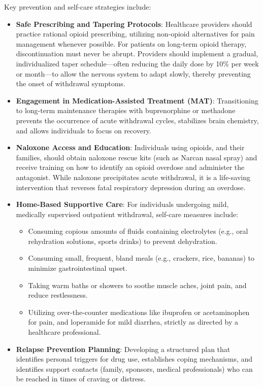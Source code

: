 Key prevention and self-care strategies include:
\begin{itemize}
    \item \textbf{Safe Prescribing and Tapering Protocols}: Healthcare providers should practice rational opioid prescribing, utilizing non-opioid alternatives for pain management whenever possible. For patients on long-term opioid therapy, discontinuation must never be abrupt. Providers should implement a gradual, individualized taper schedule—often reducing the daily dose by 10\% per week or month—to allow the nervous system to adapt slowly, thereby preventing the onset of withdrawal symptoms.
    \item \textbf{Engagement in Medication-Assisted Treatment (MAT)}: Transitioning to long-term maintenance therapies with buprenorphine or methadone prevents the occurrence of acute withdrawal cycles, stabilizes brain chemistry, and allows individuals to focus on recovery.
    \item \textbf{Naloxone Access and Education}: Individuals using opioids, and their families, should obtain naloxone rescue kits (such as Narcan nasal spray) and receive training on how to identify an opioid overdose and administer the antagonist. While naloxone precipitates acute withdrawal, it is a life-saving intervention that reverses fatal respiratory depression during an overdose.
    \item \textbf{Home-Based Supportive Care}: For individuals undergoing mild, medically supervised outpatient withdrawal, self-care measures include:
    \begin{itemize}
        \item Consuming copious amounts of fluids containing electrolytes (e.g., oral rehydration solutions, sports drinks) to prevent dehydration.
        \item Consuming small, frequent, bland meals (e.g., crackers, rice, bananas) to minimize gastrointestinal upset.
        \item Taking warm baths or showers to soothe muscle aches, joint pain, and reduce restlessness.
        \item Utilizing over-the-counter medications like ibuprofen or acetaminophen for pain, and loperamide for mild diarrhea, strictly as directed by a healthcare professional.
    \end{itemize}
    \item \textbf{Relapse Prevention Planning}: Developing a structured plan that identifies personal triggers for drug use, establishes coping mechanisms, and identifies support contacts (family, sponsors, medical professionals) who can be reached in times of craving or distress.
\end{itemize}

